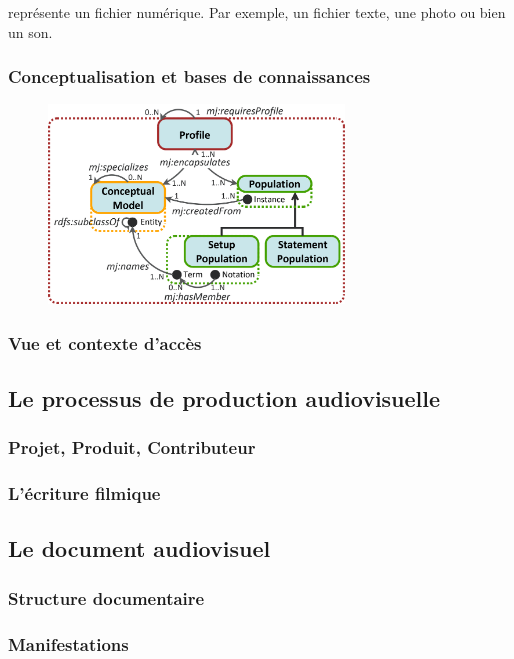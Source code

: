  représente un fichier numérique. Par exemple, un fichier texte, une photo ou bien un son. 



\subsubsection{Conceptualisation et bases de connaissances}\label{}
\begin{figure}[ht!]
\centering
\includegraphics[width=0.7\textwidth]{./images/MOD-Profile-v3.png}
\caption{}
\label{img:conceptualisation}
\end{figure}


\subsubsection{Vue et contexte d'accès}\label{}


\subsection{Le processus de production audiovisuelle}\label{}
\subsubsection{Projet, Produit, Contributeur}\label{}
\subsubsection{L'écriture filmique}\label{}


\subsection{Le document audiovisuel}\label{}
\subsubsection{Structure documentaire}\label{}
\subsubsection{Manifestations}




